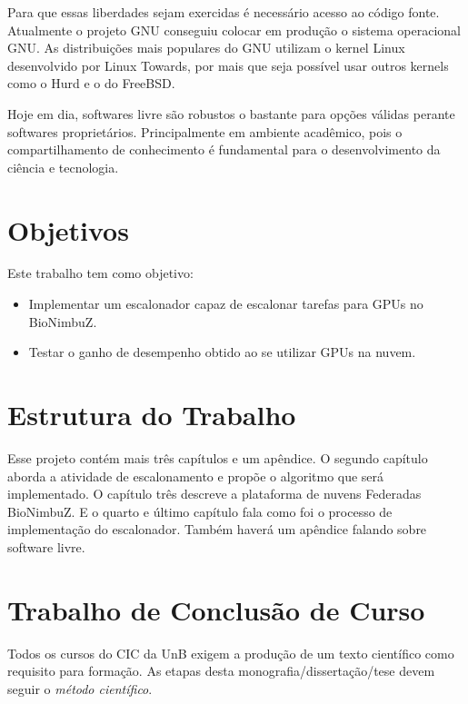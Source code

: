 Para que essas liberdades sejam exercidas é necessário acesso ao código fonte. Atualmente o projeto GNU conseguiu colocar em produção o sistema operacional GNU. As distribuições mais populares do GNU utilizam o kernel Linux desenvolvido por Linux Towards, por mais que seja possível usar outros kernels como o Hurd\cite{Hurd} e o do FreeBSD\cite{Debian_kFreeBSD}.

Hoje em dia, softwares livre são robustos o bastante para opções válidas perante softwares proprietários. Principalmente em ambiente acadêmico, pois o compartilhamento de conhecimento é fundamental para o desenvolvimento da ciência e tecnologia.

\section{Objetivos}
Este trabalho tem como objetivo:
\begin{itemize}
	\item Implementar um escalonador capaz de escalonar tarefas para \acrshort{GPU}s no BioNimbuZ.
	\item Testar o ganho de desempenho obtido ao se utilizar \acrshort{GPU}s na nuvem.
\end{itemize}

\section{Estrutura do Trabalho}
Esse projeto contém mais três capítulos e um apêndice. O segundo capítulo aborda a atividade de escalonamento e propõe o algoritmo que será implementado. O capítulo três descreve a plataforma de nuvens Federadas BioNimbuZ. E o quarto e último capítulo fala como foi o processo de implementação do escalonador. Também haverá um apêndice falando sobre software livre.

\iffalse


\section{Trabalho de Conclusão de Curso}%
Todos os cursos do \acrfull{CIC} da \acrfull{UnB} exigem a produção de um
texto científico como requisito para formação. %
As etapas desta monografia/dissertação/tese devem seguir o \emph{método científico}.


